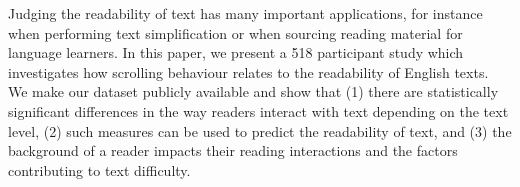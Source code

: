 Judging the readability of text has many important applications, for instance when performing text simplification or when sourcing reading material for language learners. In this paper, we present a 518 participant study which investigates how scrolling behaviour relates to the readability of English texts. We make our dataset publicly available and show that (1) there are statistically significant differences in the way readers interact with text depending on the text level, (2) such measures can be used to predict the readability of text, and (3) the background of a reader impacts their reading interactions and the factors contributing to text difficulty.
